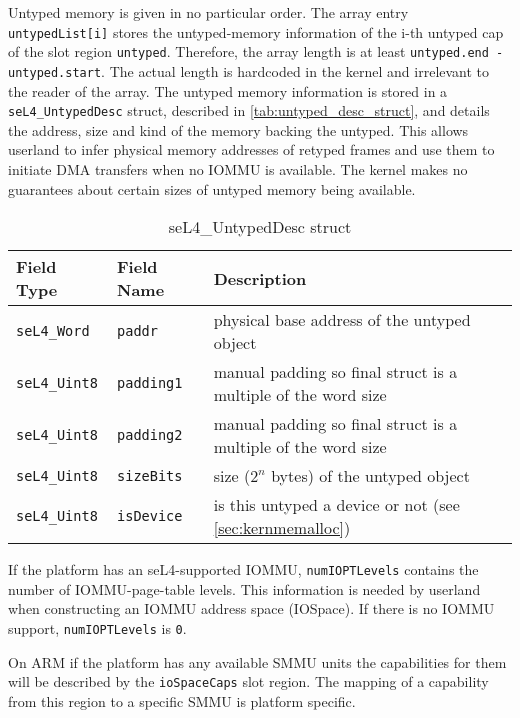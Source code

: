 Untyped memory is given in no particular order. The array entry
\texttt{untypedList[i]} stores the untyped-memory information of
the i-th untyped cap of the slot region \texttt{untyped}. Therefore, the array
length is at least \texttt{untyped.end - untyped.start}. The actual length is
hardcoded in the kernel and irrelevant to the reader of the array. The untyped
memory information is stored in a \texttt{seL4\_UntypedDesc} struct, described
in \autoref{tab:untyped_desc_struct}, and details the address, size and kind of
the memory backing the untyped. This allows userland to infer physical memory
addresses of retyped frames and use them to initiate DMA transfers when no
IOMMU is available. The kernel makes no guarantees about certain sizes of untyped
memory being available.

\begin{table}[htb]
  \begin{center}
    \caption{seL4\_UntypedDesc struct}
    \label{tab:untyped_desc_struct}
    \begin{tabular}{lll}
      \toprule
      Field Type & Field Name & Description \\
      \midrule
      \texttt{seL4\_Word}  & \texttt{paddr}    & physical base address of the untyped object \\
      \texttt{seL4\_Uint8} & \texttt{padding1} & manual padding so final struct is a multiple of the word size \\
      \texttt{seL4\_Uint8} & \texttt{padding2} & manual padding so final struct is a multiple of the word size \\
      \texttt{seL4\_Uint8} & \texttt{sizeBits} & size ($2^n$ bytes) of the untyped object \\
      \texttt{seL4\_Uint8} & \texttt{isDevice} & is this untyped a device or not (see \autoref{sec:kernmemalloc}) \\
      \bottomrule
    \end{tabular}
  \end{center}
\end{table}

If the platform has an seL4-supported IOMMU, \texttt{numIOPTLevels} contains
the number of IOMMU-page-table levels. This information is needed by userland
when constructing an IOMMU address space (IOSpace). If there is no IOMMU
support, \texttt{numIOPTLevels} is \texttt{0}.

On ARM if the platform has any available SMMU units the capabilities for them
will be described by the \texttt{ioSpaceCaps} slot region. The mapping of a
capability from this region to a specific SMMU is platform specific.

